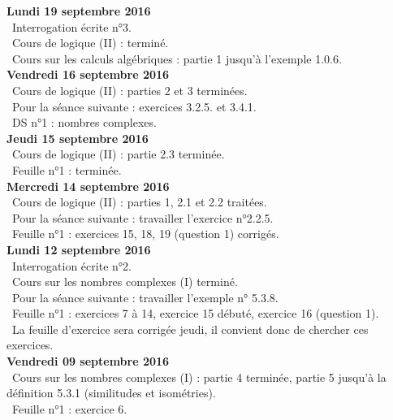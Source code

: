 \documentclass[12pt,a4paper]{article}
\begin{document}
\noindent\textbf{Lundi 19 septembre 2016}\\
\bu\ Interrogation écrite n°3.\\
\bu\ Cours de logique (II) : terminé.\\
\bu\ Cours sur les calculs algébriques : partie 1 jusqu'à l'exemple 1.0.6.\vspace{.4cm}\\

\noindent\textbf{Vendredi 16 septembre 2016}\\
\bu\ Cours de logique (II) : parties 2 et 3 terminées.\\
\bu\ Pour la séance suivante : exercices 3.2.5. et 3.4.1.\\
\bu\ DS n°1 : nombres complexes.\vspace{.4cm}\\

\noindent\textbf{Jeudi 15 septembre 2016}\\
\bu\ Cours de logique (II) : partie 2.3 terminée.\\
\bu\ Feuille n°1 : terminée.\vspace{.4cm}\\

\noindent\textbf{Mercredi 14 septembre 2016}\\
\bu\ Cours de logique (II) : parties 1, 2.1 et 2.2 traitées.\\
\bu\ Pour la séance suivante : travailler l'exercice n°2.2.5.\\
\bu\ Feuille n°1 : exercices 15, 18, 19 (question 1) corrigés.\vspace{.4cm}\\

\noindent\textbf{Lundi 12 septembre 2016}\\
\bu\ Interrogation écrite n°2.\\
\bu\ Cours sur les nombres complexes (I) terminé.\\
\bu\ Pour la séance suivante : travailler l'exemple n° 5.3.8.\\
\bu\ Feuille n°1 : exercices 7 à 14, exercice 15 débuté, exercice 16 (question 1).\\
\bu\ La feuille d'exercice sera corrigée jeudi, il convient donc de chercher ces exercices.\vspace{.4cm}\\

\noindent\textbf{Vendredi 09 septembre 2016}\\
\bu\ Cours sur les nombres complexes (I) : partie 4 terminée, partie 5 jusqu'à la définition 5.3.1 (similitudes et isométries).\\
\bu\ Feuille n°1 : exercice 6.\vspace{.4cm}\\
\end{document}
